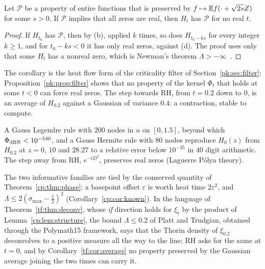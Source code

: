 \begin{corollary}\label{tf:cor:average}
Let $\mathcal P$ be a property of entire functions that is preserved by $f\mapsto\mathbb{E} f(\cdot+\sqrt{2s}Z)$ for some $s>0$. If $\mathcal P$ implies that all zeros are real, then $H_t$ has $\mathcal P$ for no real $t$.
\end{corollary}

\begin{proof}
If $H_{t_0}$ has $\mathcal P$, then by (b), applied $k$ times, so does $H_{t_0-ks}$ for every integer $k\ge1$, and for $t_0-ks<0$ it has only real zeros, against (d). The proof uses only that some $H_t$ has a nonreal zero, which is Newman's theorem $\Lambda>-\infty$~\cite{Newman1976}.
\end{proof}

The corollary is the heat flow form of the criticality filter of Section~\ref{pk:sec:filter}: Proposition~\ref{pk:prop:filter} shows that no property of the kernel $\Phi_t$ that holds at some $t<0$ can force real zeros. The step towards RH, from $t=0.2$ down to $0$, is an average of $H_{0.2}$ against a Gaussian of variance $0.4$: a contraction, stable to compute.

A Gauss Legendre rule with $200$ nodes in $u$ on $[0,1.5]$, beyond which $\Phi_{\rm dBN}<10^{-540}$, and a Gauss Hermite rule with $80$ nodes reproduce $H_0(z)$ from $H_{0.2}$ at $z=0$, $10$ and $28.27$ to a relative error below $10^{-35}$ in $40$ digit arithmetic. The step away from RH, $e^{-tD^2}$, preserves real zeros (Laguerre P\'olya theory).

The two informative families are tied by the conserved quantity of Theorem~\ref{cp:thm:phase}: a basepoint offset $\varepsilon$ is worth heat time $2\varepsilon^2$, and $\Lambda\le2(\sigma_{\max}-\tfrac12)^2$ (Corollary~\ref{cp:cor:known}). In the language of Theorem~\ref{tf:thm:deconv}, whose \emph{if} direction holds for $\xi_t$ by the product of Lemma~\ref{cp:lem:structure}, the bound $\Lambda\le0.2$ of Platt and Trudgian, obtained through the Polymath15 framework, says that the Thorin density of $\xi_{0.2}$ deconvolves to a positive measure all the way to the line; RH asks for the same at $t=0$, and by Corollary~\ref{tf:cor:average} no property preserved by the Gaussian average joining the two times can carry it.

